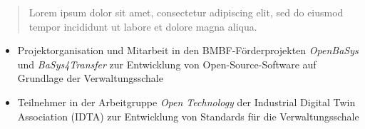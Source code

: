 \documentclass[10pt,a4paper,ragged2e,withhyper]{altacv}
\begin{document}
\begin{paracol}{2}
        
        
        
        
        
        \newpage
        
        \switchcolumn
        
            \begin{quote}
                Lorem ipsum dolor sit amet, consectetur adipiscing elit, sed do eiusmod tempor incididunt ut labore et dolore magna aliqua.
            \end{quote}
        
            \begin{itemize}
                \item Projektorganisation und Mitarbeit in den BMBF-Förderprojekten \textit{OpenBaSys}\\ und \textit{BaSys4Transfer} zur Entwicklung von Open-Source-Software auf Grundlage der Verwaltungsschale
                \item Teilnehmer in der Arbeitgruppe \textit{Open Technology} der Industrial Digital Twin Association (IDTA) zur Entwicklung von Standards für die Verwaltungsschale
            \end{itemize}
            \divider
            

\end{paracol}
\end{document}
